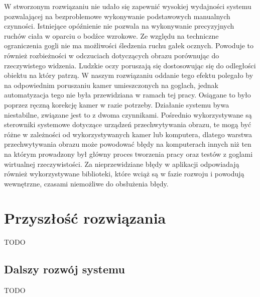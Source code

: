 \documentclass[a4paper,11pt,twoside]{report}
\theoremstyle{definition}
\begin{document}
W stworzonym rozwiązaniu nie udało się zapewnić wysokiej wydajności systemu pozwalającej na bezproblemowe wykonywanie podstawowych manualnych czynności. Istniejące opóźnienie nie pozwala na wykonywanie precyzyjnych ruchów ciała w oparciu o bodźce wzrokowe. Ze względu na techniczne ograniczenia gogli nie ma możliwości śledzenia ruchu gałek ocznych. Powoduje to również rozbieżności w odczuciach dotyczących obrazu porównując do rzeczywistego widzenia. Ludzkie oczy poruszają się dostosowując się do odległości obiektu na który patrzą. W naszym rozwiązaniu oddanie tego efektu polegało by na odpowiednim poruszaniu kamer umieszczonych na goglach, jednak automatyzacja tego nie była przewidziana w ramach tej pracy. Osiągane to było poprzez ręczną korekcję kamer w razie potrzeby. Działanie systemu bywa niestabilne, związane jest to z dwoma czynnikami. Pośrednio wykorzystywane są sterowniki systemowe dotyczące urządzeń przechwytywania obrazu, te mogą być różne w zależności od wykorzystywanych kamer lub komputera, dlatego warstwa przechwytywania obrazu może powodować błędy na komputerach innych niż ten na którym prowadzony był główny proces tworzenia pracy oraz testów z goglami wirtualnej rzeczywistości. Za nieprzewidziane błędy w aplikacji odpowiadają również wykorzystywane biblioteki, które wciąż są w fazie rozwoju i powodują wewnętrzne, czasami niemożliwe do obsłużenia błędy.

\chapter{Przyszłość rozwiązania}
TODO

\section{Dalszy rozwój systemu}
TODO
\end{document}
